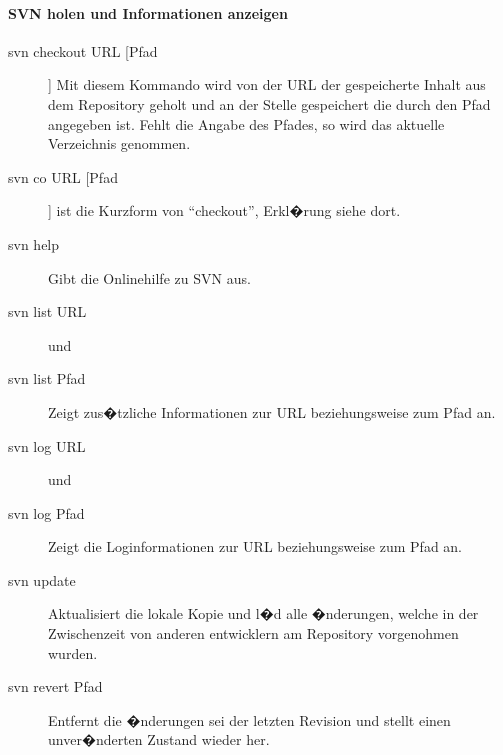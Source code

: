 \paragraph[SVN holen und Informationen anzeigen]{SVN holen und Informationen anzeigen}
\begin{description}
	\item[svn checkout URL [Pfad] ] Mit diesem Kommando wird von der URL der gespeicherte Inhalt aus dem Repository geholt und an der Stelle gespeichert die durch den Pfad angegeben ist. Fehlt die Angabe des Pfades, so wird das aktuelle Verzeichnis genommen.
\end{description}	
\begin{description}
	\item[svn co URL [Pfad] ] ist die Kurzform von "`checkout"', Erkl�rung siehe dort.
\end{description}	
\begin{description}
	\item[svn help ] Gibt die Onlinehilfe zu SVN aus.
\end{description}	
\begin{description}
	\item[svn list URL] und
	\item[svn list Pfad ] Zeigt zus�tzliche Informationen zur URL beziehungsweise zum Pfad an.
\end{description}	
\begin{description}
	\item[svn log URL] und
	\item[svn log Pfad ] Zeigt die Loginformationen zur URL beziehungsweise zum Pfad an.
\end{description}
\begin{description}
	\item[svn update] Aktualisiert die lokale Kopie und l�d alle �nderungen, welche in der Zwischenzeit von anderen entwicklern am Repository vorgenohmen wurden.
\end{description}	
\begin{description}
	\item[svn revert Pfad] Entfernt die �nderungen sei der letzten Revision und stellt einen unver�nderten Zustand wieder her. 
\end{description}	

